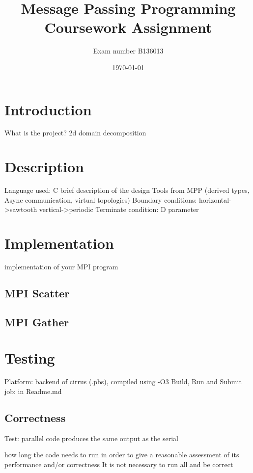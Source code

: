 \documentclass[12pt,a4paper]{article}
\newcommand{\sectionVspacing}{\vspace{15pt}}
\begin{document}
\title{Message Passing Programming Coursework Assignment}
\author{Exam number B136013}
\date{\today}

\makeEPCCtitle

\thispagestyle{empty}

\newpage
\clearpage

\tableofcontents

\newpage
\clearpage

\section{Introduction}
What is the project? 2d domain decomposition

\sectionVspacing

\section{Description}
Language used: C
brief description of the design
Tools from MPP (derived types, Async communication, virtual topologies)
Boundary conditions: horizontal->sawtooth vertical->periodic
Terminate condition: D parameter

\sectionVspacing

\section{Implementation}
implementation of your MPI program
\subsection{MPI Scatter}
\subsection{MPI Gather}

\sectionVspacing

\section{Testing}
Platform: backend of cirrus (.pbs), compiled using -O3
Build, Run and Submit job: in Readme.md

\subsection{Correctness}
Test: parallel code produces the same output as the serial

how long the code needs to run in order to give a reasonable assessment of its performance and/or correctness
It is not necessary to run all and be correct
\end{document}
